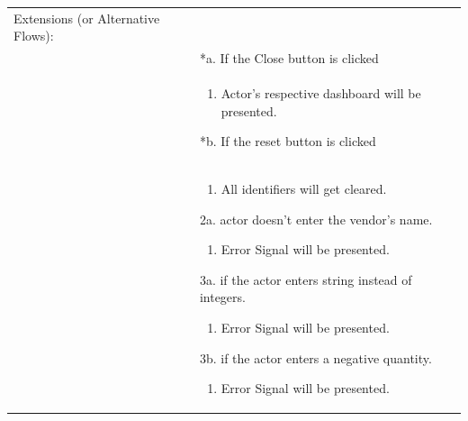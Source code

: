 \documentclass[12pt,a4paper]{article}
\begin{document}
\begin{longtable}{| p{3cm}|p{12cm}|}
Extensions (or Alternative Flows):\\
& *a. If the Close button is clicked \\
& \begin{enumerate}
		\item Actor's respective dashboard will be presented.
	\end{enumerate}
*b. If the reset button is clicked \\
&	\begin{enumerate}
		\item All identifiers will get cleared.
	\end{enumerate}
2a. actor doesn't enter the vendor's name.
 	\begin{enumerate}
		\item Error Signal will be presented.
	\end{enumerate}
3a. if the actor enters string instead of integers.
 	\begin{enumerate}
		\item Error Signal will be presented.
	\end{enumerate}
3b. if the actor enters a negative quantity.
 	\begin{enumerate}
		\item Error Signal will be presented.
	\end{enumerate}


\end{longtable}
\end{document}
